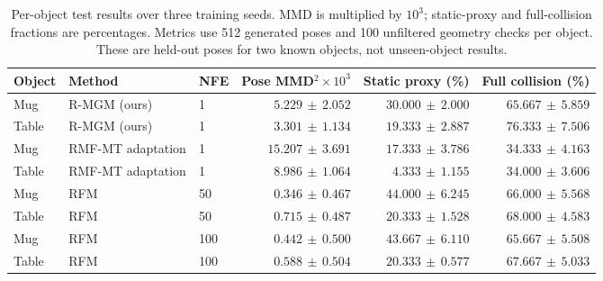 \begin{table}[H]
\centering\small
\caption{Per-object test results over three training seeds. MMD is multiplied by $10^3$; static-proxy and full-collision fractions are percentages. Metrics use 512 generated poses and 100 unfiltered geometry checks per object. These are held-out poses for two known objects, not unseen-object results.}
\label{tab:grasp-object}
\begin{tabular}{@{}lllrrr@{}}
\toprule
Object & Method & NFE & Pose MMD$^2\times10^3$ & Static proxy (\%) & Full collision (\%) \\
\midrule
Mug & R-MGM (ours) & 1 & $5.229\,\pm\,2.052$ & $30.000\,\pm\,2.000$ & $65.667\,\pm\,5.859$ \\
Table & R-MGM (ours) & 1 & $3.301\,\pm\,1.134$ & $19.333\,\pm\,2.887$ & $76.333\,\pm\,7.506$ \\
Mug & RMF-MT adaptation & 1 & $15.207\,\pm\,3.691$ & $17.333\,\pm\,3.786$ & $34.333\,\pm\,4.163$ \\
Table & RMF-MT adaptation & 1 & $8.986\,\pm\,1.064$ & $4.333\,\pm\,1.155$ & $34.000\,\pm\,3.606$ \\
Mug & RFM & 50 & $0.346\,\pm\,0.467$ & $44.000\,\pm\,6.245$ & $66.000\,\pm\,5.568$ \\
Table & RFM & 50 & $0.715\,\pm\,0.487$ & $20.333\,\pm\,1.528$ & $68.000\,\pm\,4.583$ \\
Mug & RFM & 100 & $0.442\,\pm\,0.500$ & $43.667\,\pm\,6.110$ & $65.667\,\pm\,5.508$ \\
Table & RFM & 100 & $0.588\,\pm\,0.504$ & $20.333\,\pm\,0.577$ & $67.667\,\pm\,5.033$ \\
\bottomrule
\end{tabular}
\end{table}
